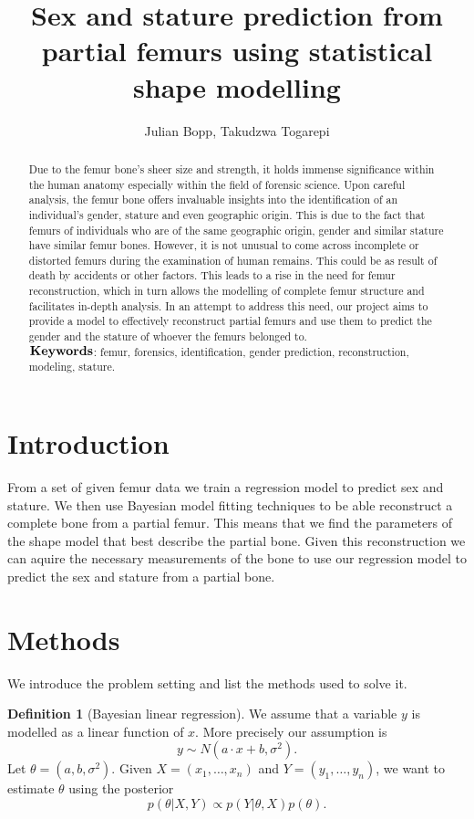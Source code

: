 \documentclass[10pt]{article}
\author{Julian Bopp, Takudzwa Togarepi}
\title{Sex and stature prediction from partial femurs using statistical shape modelling}
\theoremstyle{definition}
\newtheorem{definition}{Definition}[section]
\begin{document}
\maketitle

\begin{abstract}
\noindent
Due to the femur bone's sheer size and strength, it holds immense significance within the human anatomy especially within the field of forensic science. Upon careful analysis, the femur bone offers invaluable insights into the identification of an individual's gender, stature and even geographic origin. This is due to the fact that femurs of individuals who are of the same geographic origin, gender and similar stature have similar femur bones. However, it is not unusual to come across incomplete or distorted femurs during the examination of human remains. This could be as result of death by accidents or other factors. This leads to a rise in the need for femur reconstruction, which in turn allows the modelling of complete femur structure and facilitates in-depth analysis. In an attempt to address this need, our project aims to  provide a model to effectively reconstruct partial femurs and use them to predict the gender and the stature of whoever the femurs belonged to.\\

\noindent
$\bold{Keywords}$: femur, forensics, identification, gender prediction, reconstruction, modeling, stature.\\

\end{abstract}
\section{Introduction} From a set of given femur data we train a regression model to predict sex and stature.
We then use Bayesian model fitting techniques to be able reconstruct a complete bone from a partial femur. This means that we find the parameters of the shape model that best describe the partial bone. Given this reconstruction we can aquire the necessary measurements of the bone to use our regression model to predict the sex and stature from a partial bone.

\section{Methods}
We introduce the problem setting and list the methods used to solve it.

\begin{definition}[Bayesian linear regression]
We assume that a variable $y$ is modelled as a linear function of $x$. More precisely our assumption is
\begin{equation}
y \sim N(a\cdot x + b, \sigma^2).
\end{equation}
Let $\theta = (a,b,\sigma^2)$. Given $X=(x_1,\dots,x_n)$ and $Y=(y_1,\dots,y_n)$, we want to estimate $\theta$ using the posterior
$$p(\theta|X,Y) \propto p(Y|\theta,X)p(\theta).$$
\end{definition}
\end{document}
